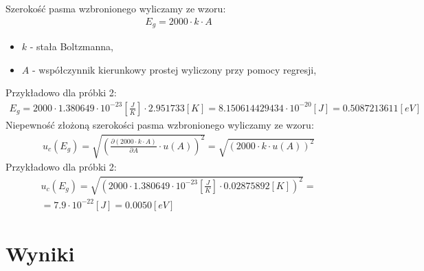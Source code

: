 \documentclass[11pt]{article}
\begin{document}
    Szerokość pasma wzbronionego wyliczamy ze wzoru:
    \begin{gather*}
        E_g=2000\cdot k\cdot A
    \end{gather*}
    {\footnotesize
        \begin{itemize}
            \item[] $k$ - stała Boltzmanna,
            \item[] $A$ - współczynnik kierunkowy prostej wyliczony przy pomocy regresji,
        \end{itemize}}
    Przykładowo dla próbki 2:
    \begin{gather*}
        E_g=2000\cdot 1.380649\cdot 10^{-23}[\frac{J}{K}]\cdot 2.951733[K]=8.150614429434\cdot 10^{-20}[J]=0.5087213611[eV]
    \end{gather*}
    Niepewność złożoną szerokości pasma wzbronionego wyliczamy ze wzoru:
    \begin{gather*}
        u_c(E_g)=\sqrt{\left(\frac{\partial (2000\cdot k\cdot A)}{\partial A}\cdot u(A)\right)^2}=\sqrt{\left(2000\cdot k\cdot u(A)\right)^2}
    \end{gather*}
    Przykładowo dla próbki 2:
    \begin{gather*}
        u_c(E_g)=\sqrt{\left(2000\cdot 1.380649\cdot 10^{-23}[\frac{J}{K}]\cdot 0.02875892[K]\right)^2}=\\
        =7.9\cdot 10^{-22}[J]=0.0050[eV]
    \end{gather*}

    \section{Wyniki}
\end{document}
